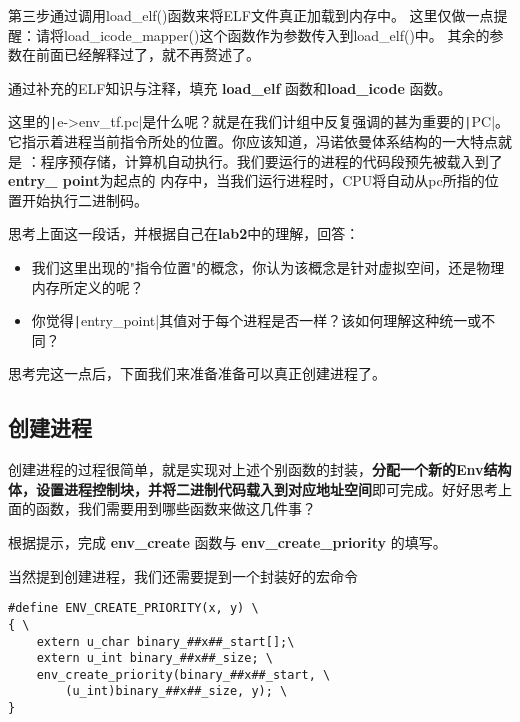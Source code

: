 第三步通过调用load\_elf()函数来将ELF文件真正加载到内存中。
这里仅做一点提醒：请将load\_icode\_mapper()这个函数作为参数传入到load\_elf()中。
其余的参数在前面已经解释过了，就不再赘述了。

\begin{exercise}
    通过补充的ELF知识与注释，填充 \textbf{load\_elf} 函数和\textbf{load\_icode} 函数。
\end{exercise}

这里的\texttt|e->env_tf.pc|是什么呢？就是在我们计组中反复强调的甚为重要的\texttt|PC|。
它指示着进程当前指令所处的位置。你应该知道，冯诺依曼体系结构的一大特点就是
：程序预存储，计算机自动执行。我们要运行的进程的代码段预先被载入到了\textbf{entry\_ point}为起点的
内存中，当我们运行进程时，CPU将自动从pc所指的位置开始执行二进制码。

\begin{thinking}\label{think-位置}
思考上面这一段话，并根据自己在\textbf{lab2}中的理解，回答：
  \begin{itemize}
  \item 我们这里出现的"指令位置"的概念，你认为该概念是针对虚拟空间，还是物理内存所定义的呢？
  \item 你觉得\texttt|entry_point|其值对于每个进程是否一样？该如何理解这种统一或不同？
  \end{itemize}
\end{thinking}

思考完这一点后，下面我们来准备准备可以真正创建进程了。

\subsection{创建进程}

创建进程的过程很简单，就是实现对上述个别函数的封装，\textbf{分配一个新的Env结构体，设置进程控制块，并将二进制代码载入到对应地址空间}即可完成。好好思考上面的函数，我们需要用到哪些函数来做这几件事？

\begin{exercise}
根据提示，完成 \textbf{env\_create} 函数与 \textbf{env\_create\_priority} 的填写。
\end{exercise}

当然提到创建进程，我们还需要提到一个封装好的宏命令

\begin{verbatim}
#define ENV_CREATE_PRIORITY(x, y) \
{ \
    extern u_char binary_##x##_start[];\
    extern u_int binary_##x##_size; \
    env_create_priority(binary_##x##_start, \
        (u_int)binary_##x##_size, y); \
}
\end{verbatim}

